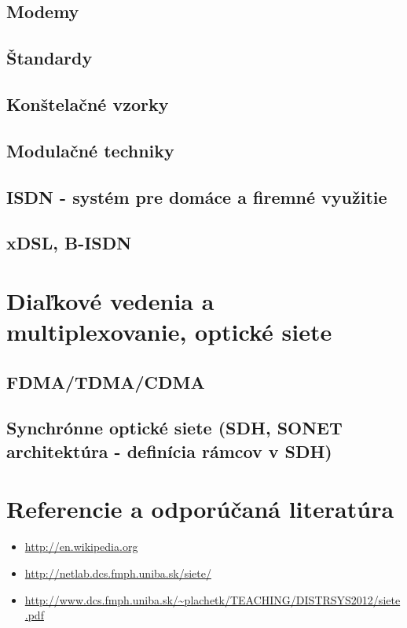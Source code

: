 \documentclass[10pt,a4paper]{article}
\begin{document}
\subsection{Modemy}      
\subsection{Štandardy}    
\subsection{Konštelačné vzorky}  
\subsection{Modulačné techniky}   
\subsection{ISDN - systém pre domáce a firemné využitie}  
\subsection{xDSL, B-ISDN}       
\section{Diaľkové vedenia a multiplexovanie, optické siete}
\subsection{FDMA/TDMA/CDMA}                           
\subsection{Synchrónne optické siete (SDH, SONET architektúra - definícia rámcov v SDH)}



\section{Referencie a odporúčaná literatúra}
\begin{itemize}                                
\item \url{http://en.wikipedia.org} 
\item \url{http://netlab.dcs.fmph.uniba.sk/siete/} 
\item \url{http://www.dcs.fmph.uniba.sk/\~plachetk/TEACHING/DISTRSYS2012/siete.pdf} 
\end{itemize}
\end{document}
